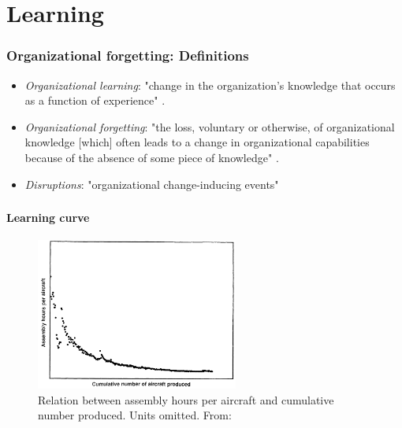 \section{Learning}

\begin{frame}
	\frametitle{Organizational forgetting: Definitions}
	\begin{itemize}
		\item \textit{Organizational learning}: "change in the organization's knowledge that occurs as a function of experience" \citep[p. 31]{Argote2013}.
		\item \textit{Organizational forgetting}: "the loss, voluntary or otherwise, of organizational knowledge [which] often leads to a change in organizational capabilities because of the absence of some piece of knowledge" \citep[p. 1606]{DeHolan2004}.
		\item \textit{Disruptions}: "organizational change-inducing events" \citep[p. 362]{Anderson2014}
	\end{itemize}
\end{frame}

\begin{frame}
	\frametitle{\insertsection}
	\framesubtitle{Learning curve}
	\begin{figure}
		\includegraphics[height=5cm]{resources/learning_curve1.png}
		\caption{Relation between assembly hours per aircraft and cumulative number produced. Units omitted. From: \citet[p. 921]{Argote1990}}
	\end{figure}
\end{frame}

